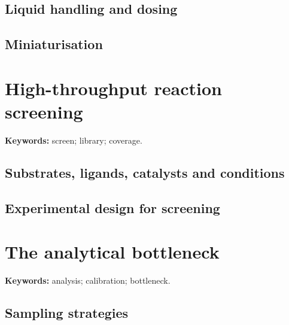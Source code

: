 
\subsection{Liquid handling and dosing}


\subsection{Miniaturisation}


\section{High-throughput reaction screening}

\begin{methodbox}
\textbf{Keywords:} screen; library; coverage.
\end{methodbox}

\subsection{Substrates, ligands, catalysts and conditions}


\subsection{Experimental design for screening}


\section{The analytical bottleneck}

\begin{warningbox}
\textbf{Keywords:} analysis; calibration; bottleneck.
\end{warningbox}

\subsection{Sampling strategies}


